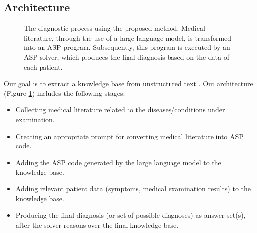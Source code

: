 \documentclass[10pt,leqno]{amsart}
\begin{document}
\subsection{Architecture}

\begin{figure}[!h]
\begin{center}
\end{center}
\caption{The diagnostic process using the proposed method. Medical literature,
	through the use of a large language model, is transformed into an ASP
	program. Subsequently, this program is executed by an ASP solver, which
	produces the final diagnosis based on the data of each patient.}
    \label{fig:architecture}
\end{figure}

Our goal is to extract a knowledge base from unstructured text \cite{ré2014feature}. Our architecture (Figure \ref{fig:architecture}) includes the following stages:

\begin{itemize}
	\item Collecting medical literature related to the diseases/conditions under examination.
	\item Creating an appropriate prompt for converting medical literature into ASP code.
	\item Adding the ASP code generated by the large language model to the knowledge base.
	\item Adding relevant patient data (symptoms, medical examination results) to the knowledge base.
	\item Producing the final diagnosis (or set of possible diagnoses) as answer set(s), after the solver reasons over the final knowledge base.
\end{itemize}
\end{document}
